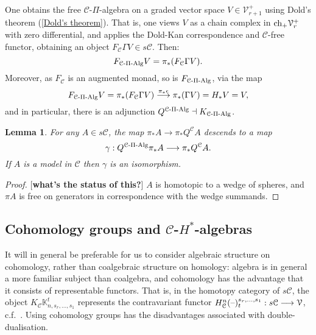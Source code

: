\documentclass[11pt]{amsart}
\theoremstyle{plain}
\newtheorem{lem}[thm]{Lemma}
\theoremstyle{definition}
\newcommand{\DASH}{\textup{--}}
\renewcommand{\to}{\longrightarrow}
\newcommand{\calC}{\mathcal{C}}
\newcommand{\calV}{\mathcal{V}}
\newcommand{\calc}{\mathcal{C}}
\theoremstyle{plain}
\newcommand{\vect}[2]{\calV^{#1}_{#2}}
\newcommand{\PiAlg}{\textup{-$\Pi$-Alg}}
\newcommand{\complexes}{\textup{ch}_+}
\begin{document}
\begin{CPiAlgs and CHalgs}
One obtains the free $\calc$-$\Pi$-algebra on a graded vector space $V\in \vect{+}{r+1}$ using Dold's theorem (\ref{Dold's theorem}). That is, one views $V$ as a chain complex in $\complexes\vect{+}{r}$ with zero differential, and applies the Dold-Kan correspondence and $\calc$-free functor, obtaining an object $F_\calc\Gamma V\in s\calc$. Then:
\[F_{\calc\PiAlg}V=\pi_*(F_\calc\Gamma V).\]
Moreover, as $F_{\calc}$ is an augmented monad, so is $F_{\calc\PiAlg}$, via the map
\[F_{\calc\PiAlg}V=\pi_*(F_\calc\Gamma V)\overset{\pi_*\epsilon}{\to}\pi_*(\Gamma V)=H_*V=V,\]
and in particular, there is an adjunction $Q^{\calc\PiAlg}\dashv K_{\calc\PiAlg}$.
\begin{lem}
For any $A\in s\calC$, the map $\pi_*A\to \pi_*Q^\calc A$ descends to a map 
\[\gamma:Q^{\calC\PiAlg}\pi_* A\to \pi_* Q^{\calC}A.\]
If $A$ is a model in $\calc$ then $\gamma$ is an isomorphism.
\end{lem}
\begin{proof}{[\textbf{what's the status of this?}]} $A$ is homotopic to a wedge of spheres, and $\pi A$ is free on generators in correspondence with the wedge summands.
\end{proof}
\subsection{Cohomology groups and $\calC$-$H^*$-algebras}\label{cohomology and Halgs}
It will in general be preferable for us to consider algebraic structure on cohomology, rather than coalgebraic structure on homology: algebra is in general a more familiar subject than coalgebra, and cohomology has the advantage that it consists of representable functors. That is, in the homotopy category of $s\calc$, the object $K_\calC\mathbb{K}^t_{n,s_r,\ldots,s_1}$ represents the contravariant functor $H^n_{\calc}(\DASH)_t^{s_r,\ldots,s_1}:s\calc\to\vect{}{}$,  c.f.\ \cite[Proposition 4.3]{MR1089001}. Using cohomology groups has the disadvantages associated with double-dualisation.





\end{CPiAlgs and CHalgs}
\end{document}
